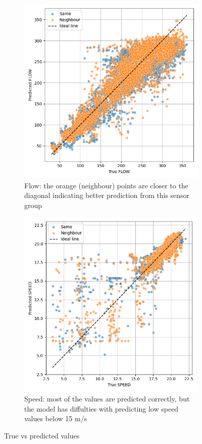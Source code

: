 	\begin{figure}[H]
		\centering
		\begin{subfigure}{0.49 \linewidth}
			\includegraphics[width=\textwidth]{../Plots/Flow/samevsneighbour_nan}
			\caption{Flow: the orange (neighbour) points are  closer to the diagonal indicating better prediction from this sensor group}
		\end{subfigure}
		\begin{subfigure}{0.49 \linewidth}
			\includegraphics[width=\textwidth]{../Plots/Speed/samevsneighbour_nan}
			\caption{Speed: most of the values are predicted correctly, but the model has diffulties with predicting low speed values below 15 m/s}
		\end{subfigure}
		\caption{True vs predicted values}
		\label{fig:samevsneighbour_nan}
	\end{figure}

